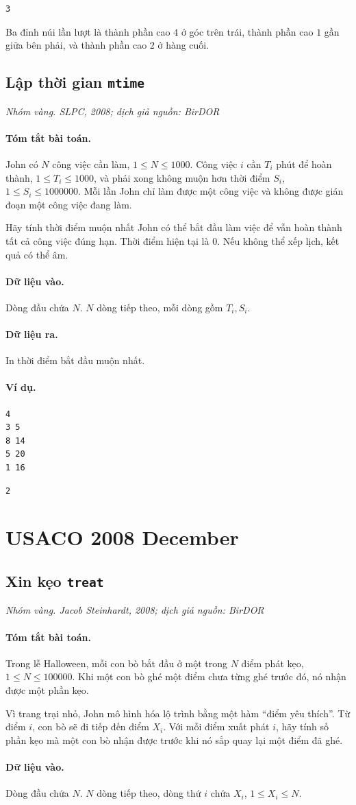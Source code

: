 \documentclass[11pt]{article}
\newcommand{\problem}[4]{%
  \subsection[#1 (#2)]{#1 \hfill {\normalsize\texttt{#2}}}%
  \noindent\textit{#3. #4}\par\smallskip
}
\newcommand{\iosec}[1]{\paragraph{#1}}
\begin{document}
\begin{verbatim}
3
\end{verbatim}

Ba đỉnh núi lần lượt là thành phần cao \(4\) ở góc trên trái, thành phần cao
\(1\) gần giữa bên phải, và thành phần cao \(2\) ở hàng cuối.

\problem{Lập thời gian}{mtime}{Nhóm vàng}{SLPC, 2008; dịch giả nguồn: BirDOR}

\iosec{Tóm tắt bài toán.}
John có \(N\) công việc cần làm, \(1\le N\le 1000\). Công việc \(i\) cần
\(T_i\) phút để hoàn thành, \(1\le T_i\le 1000\), và phải xong không muộn hơn
thời điểm \(S_i\), \(1\le S_i\le 1000000\). Mỗi lần John chỉ làm được một
công việc và không được gián đoạn một công việc đang làm.

Hãy tính thời điểm muộn nhất John có thể bắt đầu làm việc để vẫn hoàn thành
tất cả công việc đúng hạn. Thời điểm hiện tại là \(0\). Nếu không thể xếp
lịch, kết quả có thể âm.

\iosec{Dữ liệu vào.}
Dòng đầu chứa \(N\). \(N\) dòng tiếp theo, mỗi dòng gồm \(T_i,S_i\).

\iosec{Dữ liệu ra.}
In thời điểm bắt đầu muộn nhất.

\iosec{Ví dụ.}
\begin{verbatim}
4
3 5
8 14
5 20
1 16
\end{verbatim}

\begin{verbatim}
2
\end{verbatim}

\section{USACO 2008 December}

\problem{Xin kẹo}{treat}{Nhóm vàng}{Jacob Steinhardt, 2008; dịch giả nguồn: BirDOR}

\iosec{Tóm tắt bài toán.}
Trong lễ Halloween, mỗi con bò bắt đầu ở một trong \(N\) điểm phát kẹo,
\(1\le N\le 100000\). Khi một con bò ghé một điểm chưa từng ghé trước đó, nó
nhận được một phần kẹo.

Vì trang trại nhỏ, John mô hình hóa lộ trình bằng một hàm ``điểm yêu thích''.
Từ điểm \(i\), con bò sẽ đi tiếp đến điểm \(X_i\). Với mỗi điểm xuất phát
\(i\), hãy tính số phần kẹo mà một con bò nhận được trước khi nó sắp quay lại
một điểm đã ghé.

\iosec{Dữ liệu vào.}
Dòng đầu chứa \(N\). \(N\) dòng tiếp theo, dòng thứ \(i\) chứa \(X_i\),
\(1\le X_i\le N\).
\end{document}
